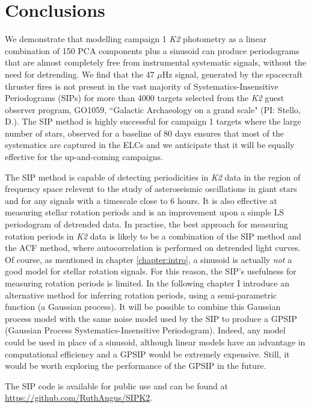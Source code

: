\section{Conclusions}
\label{sec:conclusions}
We demonstrate that modelling campaign 1 {\it K2} photometry as a linear
combination of 150 PCA components plus a sinusoid can produce periodograms
that are almost completely free from instrumental systematic signals, without
the need for detrending.
We find that the 47 $\mu$Hz signal, generated by the spacecraft thruster
fires is not present in the vast majority of Systematics-Insensitive
Periodograms (SIPs) for more than 4000 targets
selected from the {\it K2} guest observer program, GO1059, ``Galactic
Archaeology on a grand scale" (PI: Stello, D.).
The SIP method is highly successful for campaign 1 targets where the large
number of stars, observed for a baseline of 80 days ensures that most of the
systematics are captured in the ELCs and we anticipate that it will
be equally effective for the up-and-coming campaigns.

The SIP method is capable of detecting periodicities in {\it K2} data in the
region of frequency space relevent to the study of asteroseismic oscillations
in giant stars and for any signals with a timescale close to 6 hours.
It is also effective at measuring stellar rotation periods and is an
improvement upon a simple LS periodogram of detrended data.
In practise, the best approach for measuring rotation periods in {\it K2} data
is likely to be a combination of the SIP method and the ACF method, where
autocorrelation is performed on detrended light curves.
Of course, as mentioned in chapter \ref{chapter:intro}, a sinusoid is actually
{\it not} a good model for stellar rotation signals.
For this reason, the SIP's usefulness for measuring rotation periods is
limited.
In the following chapter I introduce an alternative method for inferring
rotation periods, using a semi-parametric function (a Gaussian process).
It will be possible to combine this Gaussian process model with the same noise
model used by the SIP to produce a GPSIP (Gaussian Process
Systematics-Insensitive Periodogram).
Indeed, any model could be used in place of a sinusoid, although linear models
have an advantage in computational efficiency and a GPSIP would be extremely
expensive.
Still, it would be worth exploring the performance of the GPSIP in the future.

The SIP code is available for public use and can be found at
\url{https://github.com/RuthAngus/SIPK2}.
